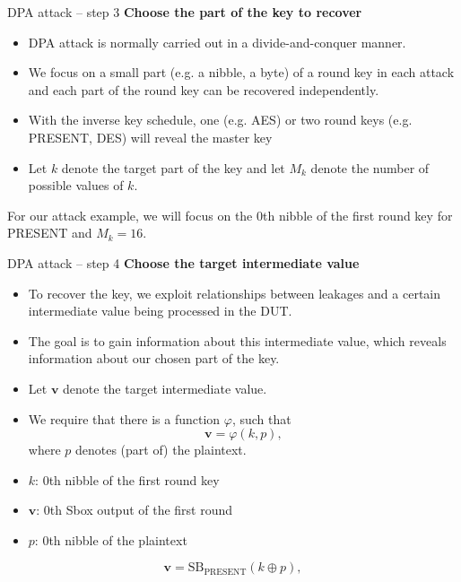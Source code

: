 \begin{frame}{DPA attack -- step 3}
    \textbf{Choose the part of the key to recover}
    \begin{itemize}
        \item DPA attack is normally carried out in a divide-and-conquer manner.
       \item We focus on a small part (e.g. a nibble, a byte) of a round key in each attack and each part of the round key can be recovered independently.
       \item With the inverse key schedule, one (e.g. AES) or two round keys (e.g. PRESENT, DES) will reveal the master key
      \item Let $k$ denote the target part of the key and let $M_k$ denote the number of possible values of $k$.
    \end{itemize}
    \begin{example}
        For our attack example, we will focus on the $0$th nibble of the first round key for PRESENT and $M_k=16$.
    \end{example}
\end{frame}

\begin{frame}{DPA attack -- step 4}
\textbf{Choose the target intermediate value}
    \begin{itemize}
        \item To recover the key, we exploit relationships between leakages and a certain intermediate value being processed in the DUT.
       \item The goal is to gain information about this intermediate value, which reveals information about our chosen part of the key.
      \item  Let $\boldsymbol{v}$ denote the target intermediate value.
   \item We require that there is a function $\varphi$, such that
    \[
    \boldsymbol{v}=\varphi(k,p),
    \]
    where $p$ denotes (part of) the plaintext.
    \end{itemize}
    \begin{example}
    \begin{itemize}
        \item $k$: $0$th nibble of the first round key
        \item $\boldsymbol{v}$: $0$th Sbox output of the first round
        \item $p$: $0$th nibble of the plaintext
    \end{itemize}
    \[
    \boldsymbol{v}=\text{SB}_{\text{PRESENT}}(k\oplus p),
    \]
    \end{example}
\end{frame}

